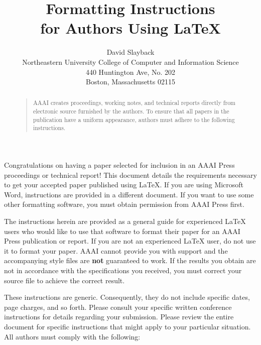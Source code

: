 \documentclass[letterpaper]{article}
\begin{document}
	\title{Formatting Instructions \\for Authors Using \LaTeX{}}
	\author{David Slayback\\
		Northeastern University College of Computer and Information Science\\
		440 Huntington Ave, No. 202\\
		Boston, Massachusetts 02115\\
	}
	\maketitle
	\begin{abstract}
		\begin{quote}
			AAAI creates proceedings, working notes, and technical reports directly from electronic source furnished by the authors. To ensure that all papers in the publication have a uniform appearance, authors must adhere to the following instructions. 
		\end{quote}
	\end{abstract}
	
	\noindent Congratulations on having a paper selected for inclusion in an AAAI Press proceedings or technical report! This document details the requirements necessary to get your accepted paper published using \LaTeX{}. If you are using Microsoft Word, instructions are provided in a different document. If you want to use some other formatting software, you must obtain permission from AAAI Press first. 
	
	The instructions herein are provided as a general guide for experienced \LaTeX{} users who would like to use that software to format their paper for an AAAI Press publication or report. If you are not an experienced \LaTeX{} user, do not use it to format your paper. AAAI cannot provide you with support and the accompanying style files are \textbf{not} guaranteed to work. If the results you obtain are not in accordance with the specifications you received, you must correct your source file to achieve the correct result. 
	
	These instructions are generic. Consequently, they do not include specific dates, page charges, and so forth. Please consult your specific written conference instructions for details regarding your submission. Please review the entire document for specific instructions that might apply to your particular situation. All authors must comply with the following:
	
\end{document}
